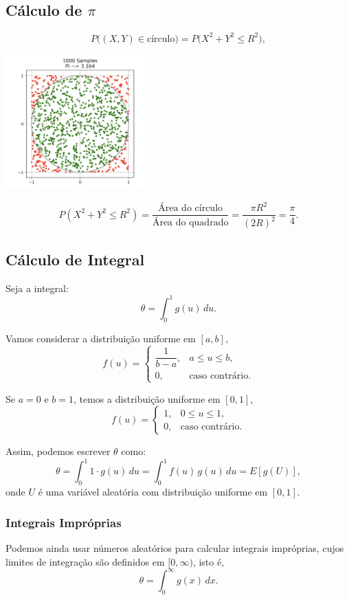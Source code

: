 \documentclass{article}
\begin{document}
\subsection{Cálculo de $\pi$}
    $$
    P\big((X, Y) \in \text{círculo}\big) = P\big(X^2 + Y^2 \le R^2\big),
    $$

    \begin{center}
        \includegraphics[width=0.4\textwidth]{figuras/monte_carlo_calculo_pi.png}
    \end{center}

    $$
    P(X^2 + Y^2 \le R^2) =
    \frac{\text{Área do círculo}}{\text{Área do quadrado}} =
    \frac{\pi R^2}{(2R)^2} = \frac{\pi}{4}.
    $$

\subsection{Cálculo de Integral}
Seja a integral:
    $$
    \theta = \int_{0}^{1} g(u)\, du.
    $$

Vamos considerar a distribuição uniforme em $[a,b]$,
    $$
    f(u) =
    \begin{cases}
    \dfrac{1}{b-a}, & a \le u \le b,\\[6pt]
    0, & \text{caso contrário.}
    \end{cases}
    $$
    
Se $a=0$ e $b=1$, temos a distribuição uniforme em $[0,1]$,
    $$
    f(u) =
    \begin{cases}
    1, & 0 \le u \le 1,\\
    0, & \text{caso contrário.}
    \end{cases}
    $$
    
Assim, podemos escrever $\theta$ como:
    $$
    \theta = \int_{0}^{1} 1 \cdot g(u)\, du
    = \int_{0}^{1} f(u)\, g(u)\, du
    = E[g(U)],
    $$
onde $U$ é uma variável aleatória com distribuição uniforme em $[0,1]$.

\subsubsection{Integrais Impróprias}
Podemos ainda usar números aleatórios para calcular integrais impróprias, cujos limites de integração são definidos em $[0, \infty)$, isto é,
    $$
    \theta = \int_{0}^{\infty} g(x)\, dx.
    $$
\end{document}

